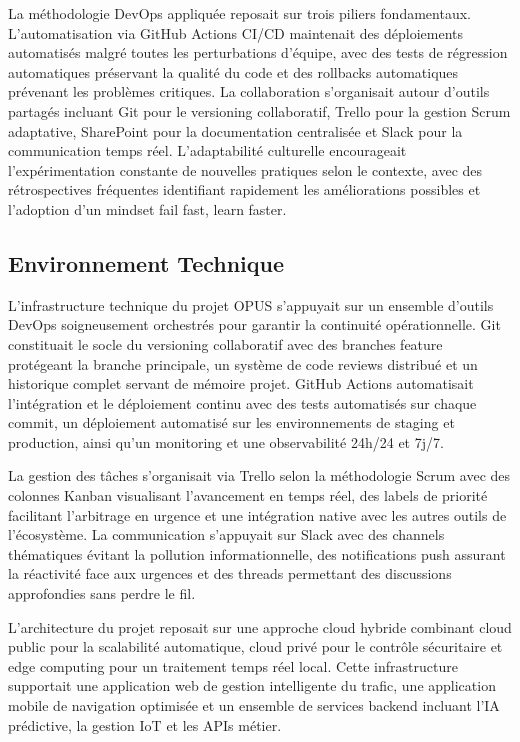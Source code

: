 \documentclass[12pt,a4paper]{article}
\begin{document}
La méthodologie DevOps appliquée reposait sur trois piliers fondamentaux. L'automatisation via GitHub Actions CI/CD maintenait des déploiements automatisés malgré toutes les perturbations d'équipe, avec des tests de régression automatiques préservant la qualité du code et des rollbacks automatiques prévenant les problèmes critiques. La collaboration s'organisait autour d'outils partagés incluant Git pour le versioning collaboratif, Trello pour la gestion Scrum adaptative, SharePoint pour la documentation centralisée et Slack pour la communication temps réel. L'adaptabilité culturelle encourageait l'expérimentation constante de nouvelles pratiques selon le contexte, avec des rétrospectives fréquentes identifiant rapidement les améliorations possibles et l'adoption d'un mindset fail fast, learn faster.

\subsection{Environnement Technique}

L'infrastructure technique du projet OPUS s'appuyait sur un ensemble d'outils DevOps soigneusement orchestrés pour garantir la continuité opérationnelle. Git constituait le socle du versioning collaboratif avec des branches feature protégeant la branche principale, un système de code reviews distribué et un historique complet servant de mémoire projet. GitHub Actions automatisait l'intégration et le déploiement continu avec des tests automatisés sur chaque commit, un déploiement automatisé sur les environnements de staging et production, ainsi qu'un monitoring et une observabilité 24h/24 et 7j/7.

La gestion des tâches s'organisait via Trello selon la méthodologie Scrum avec des colonnes Kanban visualisant l'avancement en temps réel, des labels de priorité facilitant l'arbitrage en urgence et une intégration native avec les autres outils de l'écosystème. La communication s'appuyait sur Slack avec des channels thématiques évitant la pollution informationnelle, des notifications push assurant la réactivité face aux urgences et des threads permettant des discussions approfondies sans perdre le fil.

L'architecture du projet reposait sur une approche cloud hybride combinant cloud public pour la scalabilité automatique, cloud privé pour le contrôle sécuritaire et edge computing pour un traitement temps réel local. Cette infrastructure supportait une application web de gestion intelligente du trafic, une application mobile de navigation optimisée et un ensemble de services backend incluant l'IA prédictive, la gestion IoT et les APIs métier.
\end{document}
